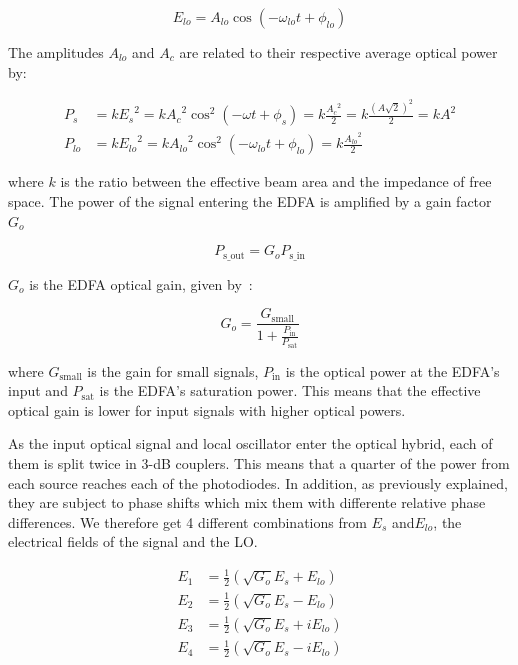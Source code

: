 	\begin{equation}
		E_{lo} = A_{lo} \cos{(-\omega_{lo} t + \phi_{lo})}
	\end{equation}

	The amplitudes $A_{lo}$ and $A_c$ are related to their respective average optical power by:

	\begin{align*}
		P_s    &= k {E_s}^2    = k {A_c}^2 \cos^2(-\omega t + \phi_s) = k
		\frac{{A_c}^2}{2} = k \frac{{(A \sqrt{2})}^2}{2} = k A^2 \\
		P_{lo} &= k {E_{lo}}^2 = k {A_{lo}}^2 \cos^2(-\omega_{lo} t + \phi_{lo}) = k \frac{{A_{lo}}^2}{2}
	\end{align*}

	\noindent where $k$ is the ratio between the effective beam area and the impedance of free
	space. The power of the signal entering the EDFA is amplified by a gain factor $G_o$

	\begin{equation}
		P_{\text{s\_out}} = G_o P_{\text{s\_in}}
	\end{equation}

	\noindent	$G_o$ is the EDFA optical gain, given by~\cite{mukai81}:

	\begin{equation}\label{fig:ampGain}
		G_o = \frac{G_\text{small}}{1+\frac{P_\text{in}}{P_{\text{sat}}}}
	\end{equation}

	\noindent where $G_\text{small}$ is the gain for small signals, $P_\text{in}$ is
	the optical power at the EDFA's input and $P_\text{sat}$ is the EDFA's
	saturation power. This means that the effective optical gain is lower for
	input signals with higher optical powers.


	As the input optical signal and local oscillator enter the optical hybrid,
	each of them is split twice in 3-dB couplers. This means that a quarter of the
	power from each source reaches each of the photodiodes. In addition, as
	previously explained, they are subject to phase shifts which mix them with
	differente relative phase differences.
	We therefore get 4 different combinations from $E_s$ and$E_{lo}$, the
	electrical fields of the signal and the LO.

	\begin{align*}
		E_1 &= \frac{1}{2}\left(\sqrt{G_o} E_s + E_{lo}\right) \\
		E_2 &= \frac{1}{2}\left(\sqrt{G_o} E_s - E_{lo}\right) \\
		E_3 &= \frac{1}{2}\left(\sqrt{G_o} E_s + i E_{lo}\right) \\
		E_4 &= \frac{1}{2}\left(\sqrt{G_o} E_s - i E_{lo}\right) \\
	\end{align*}

